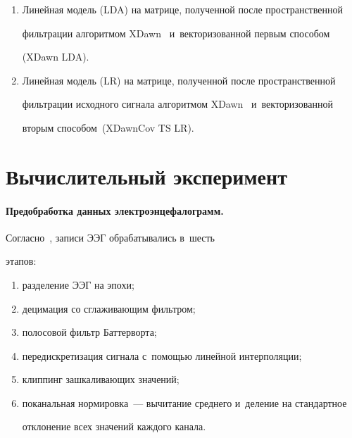\begin{enumerate}
векторизованной вторым способом  (ERPCov TS LR).

        \item %

    Линейная модель (LDA) на матрице, полученной после пространственной 

фильтрации алгоритмом XDawn~\cite{xdawn} и~векторизованной первым способом 

(XDawn LDA).

     \item  Линейная модель (LR) на матрице, полученной после пространственной 

фильтрации исходного сигнала алгоритмом XDawn~\cite{xdawn} и~векторизованной 

вторым способом~(XDawnCov TS LR).   %

\end{enumerate}



\section{Вычислительный эксперимент}



\paragraph*{Предобработка данных электроэнцефалограмм.}

Согласно~\cite{Plug_and_Play_P300_BCI}, записи ЭЭГ обрабатывались в~шесть 

этапов: 

\begin{enumerate}[(1)]

    \item

разделение ЭЭГ на эпохи;

    \item

децимация со сглаживающим фильтром;

   \item

полосовой фильтр Баттерворта;

    \item

передискретизация сигнала с~помощью линейной интерполяции;

    \item

клиппинг зашкаливающих значений;

    \item

поканальная нормировка~--- вычитание среднего и~деление на стандартное 

отклонение всех значений каждого канала.

\end{enumerate}

